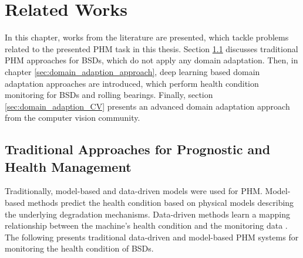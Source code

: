 
\chapter{Related Works}\label{chapter:related_works}
In this chapter, works from the literature are presented, which tackle problems related to the presented PHM task in this thesis. Section \ref{sec:traditional_approaches} discusses traditional PHM approaches for BSDs, which do not apply any domain adaptation. Then, in chapter \ref{sec:domain_adaption_approach}, deep learning based domain adaptation approaches are introduced, which perform health condition monitoring for BSDs and rolling bearings. Finally, section \ref{sec:domain_adaption_CV} presents an advanced domain adaptation approach from the computer vision community.

\section{Traditional Approaches for Prognostic and Health Management}\label{sec:traditional_approaches}

Traditionally, model-based and data-driven models were used for PHM. Model-based methods predict the health condition based on physical models describing the underlying degradation mechanisms. Data-driven methods learn a mapping relationship between the machine's health condition and the monitoring data \cite{DENG2020}. The following presents traditional data-driven and model-based PHM systems for monitoring the health condition of BSDs.

